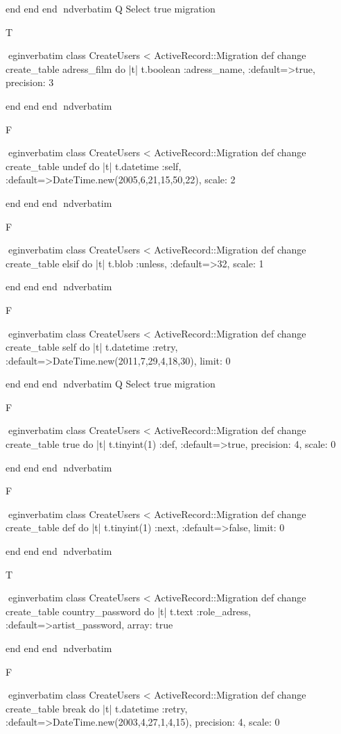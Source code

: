     end 
  end 
end
nd{verbatim}
Q
 Select true migration

T

egin{verbatim}
 class CreateUsers < ActiveRecord::Migration 
  def change 
    create_table adress_film do |t| 
      t.boolean :adress_name, :default=>true, precision: 3
    
    end 
  end 
end
nd{verbatim}

F

egin{verbatim}
 class CreateUsers < ActiveRecord::Migration 
  def change 
    create_table undef do |t| 
      t.datetime :self, :default=>DateTime.new(2005,6,21,15,50,22), scale: 2
    
    end 
  end 
end
nd{verbatim}

F

egin{verbatim}
 class CreateUsers < ActiveRecord::Migration 
  def change 
    create_table elsif do |t| 
      t.blob :unless, :default=>32, scale: 1
    
    end 
  end 
end
nd{verbatim}

F

egin{verbatim}
 class CreateUsers < ActiveRecord::Migration 
  def change 
    create_table self do |t| 
      t.datetime :retry, :default=>DateTime.new(2011,7,29,4,18,30), limit: 0
    
    end 
  end 
end
nd{verbatim}
Q
 Select true migration

F

egin{verbatim}
 class CreateUsers < ActiveRecord::Migration 
  def change 
    create_table true do |t| 
      t.tinyint(1) :def, :default=>true, precision: 4, scale: 0
    
    end 
  end 
end
nd{verbatim}

F

egin{verbatim}
 class CreateUsers < ActiveRecord::Migration 
  def change 
    create_table def do |t| 
      t.tinyint(1) :next, :default=>false, limit: 0
    
    end 
  end 
end
nd{verbatim}

T

egin{verbatim}
 class CreateUsers < ActiveRecord::Migration 
  def change 
    create_table country_password do |t| 
      t.text :role_adress, :default=>artist_password, array: true
    
    end 
  end 
end
nd{verbatim}

F

egin{verbatim}
 class CreateUsers < ActiveRecord::Migration 
  def change 
    create_table break do |t| 
      t.datetime :retry, :default=>DateTime.new(2003,4,27,1,4,15), precision: 4, scale: 0
    
